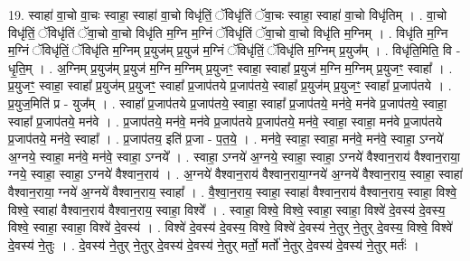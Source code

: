 \documentclass[17pt]{extarticle}
\begin{document}
19. स्वाहा॑ वा॒चो वा॒चः स्वाहा॒ स्वाहा॑ वा॒चो विधृ॑तिं॒ ॅविधृ॑तिं ॅवा॒चः स्वाहा॒ स्वाहा॑ वा॒चो विधृ॑तिम् । . वा॒चो विधृ॑तिं॒ ॅविधृ॑तिं ॅवा॒चो वा॒चो विधृ॑ति म॒ग्नि म॒ग्निं ॅविधृ॑तिं ॅवा॒चो वा॒चो विधृ॑ति म॒ग्निम् । . विधृ॑ति म॒ग्नि म॒ग्निं ॅविधृ॑तिं॒ ॅविधृ॑ति म॒ग्निम् प्र॒युज॑म् प्र॒युज॑ म॒ग्निं ॅविधृ॑तिं॒ ॅविधृ॑ति म॒ग्निम् प्र॒युज᳚म् । . विधृ॑ति॒मिति॒ वि - धृ॒ति॒म् । . अ॒ग्निम् प्र॒युज॑म् प्र॒युज॑ म॒ग्नि म॒ग्निम् प्र॒युजꣳ॒॒ स्वाहा॒ स्वाहा᳚ प्र॒युज॑ म॒ग्नि म॒ग्निम् प्र॒युजꣳ॒॒ स्वाहा᳚ । . प्र॒युजꣳ॒॒ स्वाहा॒ स्वाहा᳚ प्र॒युज॑म् प्र॒युजꣳ॒॒ स्वाहा᳚ प्र॒जाप॑तये प्र॒जाप॑तये॒ स्वाहा᳚ प्र॒युज॑म् प्र॒युजꣳ॒॒ स्वाहा᳚ प्र॒जाप॑तये । . प्र॒युज॒मिति॑ प्र - युज᳚म् । . स्वाहा᳚ प्र॒जाप॑तये प्र॒जाप॑तये॒ स्वाहा॒ स्वाहा᳚ प्र॒जाप॑तये॒ मन॑वे॒ मन॑वे प्र॒जाप॑तये॒ स्वाहा॒ स्वाहा᳚ प्र॒जाप॑तये॒ मन॑वे । . प्र॒जाप॑तये॒ मन॑वे॒ मन॑वे प्र॒जाप॑तये प्र॒जाप॑तये॒ मन॑वे॒ स्वाहा॒ स्वाहा॒ मन॑वे प्र॒जाप॑तये प्र॒जाप॑तये॒ मन॑वे॒ स्वाहा᳚ । . प्र॒जाप॑तय॒ इति॑ प्र॒जा - प॒त॒ये॒ । . मन॑वे॒ स्वाहा॒ स्वाहा॒ मन॑वे॒ मन॑वे॒ स्वाहा॒ ऽग्नये॑ अ॒ग्नये॒ स्वाहा॒ मन॑वे॒ मन॑वे॒ स्वाहा॒ ऽग्नये᳚ । . स्वाहा॒ ऽग्नये॑ अ॒ग्नये॒ स्वाहा॒ स्वाहा॒ ऽग्नये॑ वैश्वान॒राय॑ वैश्वान॒राया॒ ग्नये॒ स्वाहा॒ स्वाहा॒ ऽग्नये॑ वैश्वान॒राय॑ । . अ॒ग्नये॑ वैश्वान॒राय॑ वैश्वान॒राया॒ग्नये॑ अ॒ग्नये॑ वैश्वान॒राय॒ स्वाहा॒ स्वाहा॑ वैश्वान॒राया॒ ग्नये॑ अ॒ग्नये॑ वैश्वान॒राय॒ स्वाहा᳚ । . वै॒श्वा॒न॒राय॒ स्वाहा॒ स्वाहा॑ वैश्वान॒राय॑ वैश्वान॒राय॒ स्वाहा॒ विश्वे॒ विश्वे॒ स्वाहा॑ वैश्वान॒राय॑ वैश्वान॒राय॒ स्वाहा॒ विश्वे᳚ । . स्वाहा॒ विश्वे॒ विश्वे॒ स्वाहा॒ स्वाहा॒ विश्वे॑ दे॒वस्य॑ दे॒वस्य॒ विश्वे॒ स्वाहा॒ स्वाहा॒ विश्वे॑ दे॒वस्य॑ । . विश्वे॑ दे॒वस्य॑ दे॒वस्य॒ विश्वे॒ विश्वे॑ दे॒वस्य॑ ने॒तुर् ने॒तुर् दे॒वस्य॒ विश्वे॒ विश्वे॑ दे॒वस्य॑ ने॒तुः । . दे॒वस्य॑ ने॒तुर् ने॒तुर् दे॒वस्य॑ दे॒वस्य॑ ने॒तुर् मर्तो॒ मर्तो॑ ने॒तुर् दे॒वस्य॑ दे॒वस्य॑ ने॒तुर् मर्तः॑ । \newline
\end{document}
